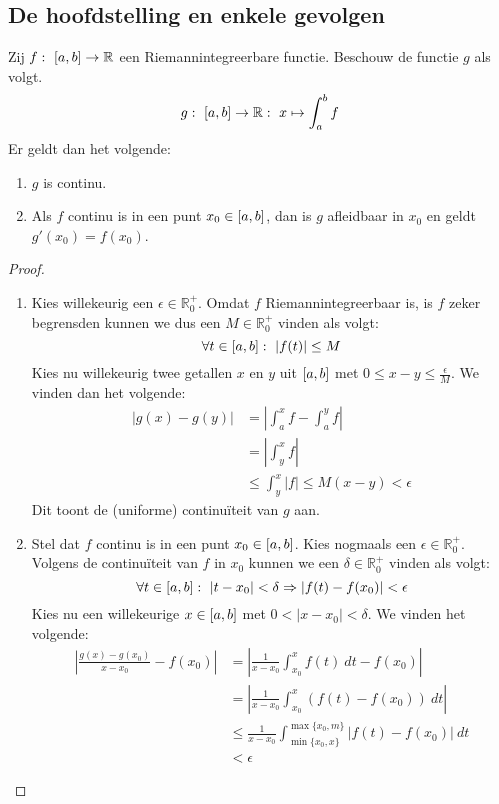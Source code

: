 \documentclass[main.tex]{subfiles}
\begin{document}
\subsection{De hoofdstelling en enkele gevolgen}
\label{sec:de-hoofdstelling-en}

\begin{bst}
  Zij $f:\ \interval{a}{b} \rightarrow \mathbb{R}$ een Riemannintegreerbare functie.
  Beschouw de functie $g$ als volgt.
  \[ g:\ \interval{a}{b} \rightarrow \mathbb{R}:\ x \mapsto \int_{a}^{b}f \]
  Er geldt dan het volgende:
  \begin{enumerate}
  \item $g$ is continu.
  \item Als $f$ continu is in een punt $x_{0}\in \interval{a}{b}$, dan is $g$ afleidbaar in $x_{0}$ en geldt $g'(x_{0}) = f(x_{0})$.
  \end{enumerate}

  \begin{proof}
    \noindent
    \begin{enumerate}
    \item 
      Kies willekeurig een $\epsilon\in\mathbb{R}_{0}^{+}$.
      Omdat $f$ Riemannintegreerbaar is, is $f$ zeker begrensd\needed en kunnen we dus een $M\in\mathbb{R}_{0}^{+}$ vinden als volgt:
      \[ \forall t\in\interval{a}{b}:\ |f(t)| \le M \]
      Kies nu willekeurig twee getallen $x$ en $y$ uit $\interval{a}{b}$ met $0 \le x-y \le \frac{\epsilon}{M}$.
      We vinden dan het volgende:
      \begin{align*}
        |g(x)-g(y)|
        &= \left|\int_{a}^{x}f-\int_{a}^{y}f\right|\\
        &= \left| \int_{y}^{x}f\right|\\
        &\le \int_{y}^{x}|f| \le M(x-y) < \epsilon
      \end{align*}
      Dit toont de (uniforme) continu\"iteit van $g$ aan.
      
    \item 
      Stel dat $f$ continu is in een punt $x_{0}\in\interval{a}{b}$.
      Kies nogmaals een $\epsilon\in\mathbb{R}_{0}^{+}$.
      Volgens de continu\"iteit van $f$ in $x_{0}$ kunnen we een $\delta\in\mathbb{R}_{0}^{+}$ vinden als volgt:
      \[ \forall t\in\interval{a}{b}:\ |t-x_{0}| < \delta \Rightarrow |f(t)-f(x_{0})| < \epsilon \]
      Kies nu een willekeurige $x\in\interval{a}{b}$ met $0 < |x-x_{0}| < \delta$.
      We vinden het volgende:
      \begin{align*}
        \left| \frac{g(x)-g(x_{0})}{x-x_{0}} - f(x_{0}) \right|
        &= \left| \frac{1}{x-x_{0}} \int_{x_{0}}^{x}f(t)\ dt - f(x_{0}) \right|\\
        &= \left| \frac{1}{x-x_{0}} \int_{x_{0}}^{x}(f(t)-f(x_{0}))\ dt \right|\\
        &\le \frac{1}{x-x_{0}} \int_{\min\{x_{0},x\}}^{\max\{x_{0},m\}}|f(t)-f(x_{0})|\ dt\\
        &< \epsilon
      \end{align*}
    \end{enumerate} 
  \end{proof}
\end{bst}
\end{document}
